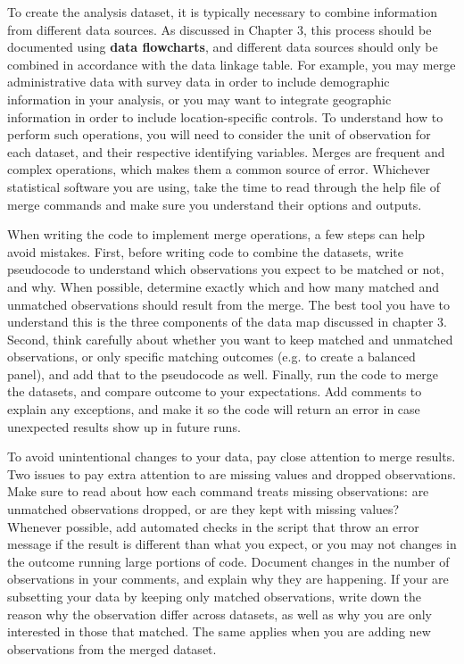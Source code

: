 To create the analysis dataset,
it is typically necessary to combine information
from different data sources.
As discussed in Chapter 3,
this process should be documented
using \textbf{data flowcharts},
and different data sources should only be combined
in accordance with the data linkage table.
For example, you may merge administrative data with survey data
in order to include demographic information in your analysis,
or you may want to integrate geographic information
in order to include location-specific controls.
To understand how to perform such operations,
you will need to consider the unit of observation for each dataset,
and their respective identifying variables.
Merges are frequent and complex operations,
which makes them a common source of error.
Whichever statistical software you are using,
take the time to read through the help file of merge commands
and make sure you understand their options and outputs.

When writing the code to implement merge operations,
a few steps can help avoid mistakes.
First, before writing code to combine the datasets,
write pseudocode to understand which observations you expect to be
matched or not, and why.
When possible, determine exactly which and how many
matched and unmatched observations should result from the merge.
The best tool you have to understand this is
the three components of the data map discussed in chapter 3.
Second, think carefully about whether you want to keep matched and unmatched observations,
or only specific matching outcomes (e.g. to create a balanced panel),
and add that to the pseudocode as well.
Finally, run the code to merge the datasets,
and compare outcome to your expectations.
Add comments to explain any exceptions,
and make it so the code will return an error in case unexpected results show up in future runs.

To avoid unintentional changes to your data,
pay close attention to merge results.
Two issues to pay extra attention to are missing values and dropped observations.
Make sure to read about how each command treats missing observations:
are unmatched observations dropped, or are they kept with missing values?
Whenever possible, add automated checks in the script that throw an error message
if the result is different than what you expect,
or you may not changes in the outcome running large portions of code.
Document changes in the number of observations in your comments,
and explain why they are happening.
If your are subsetting your data by keeping only matched observations,
write down the reason why the observation differ across datasets,
as well as why you are only interested in those that matched.
The same applies when you are adding new observations from the merged dataset.

